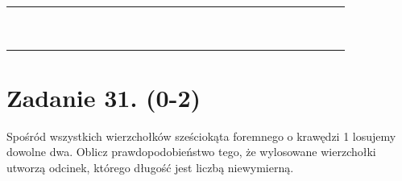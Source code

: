 \documentclass[10pt]{article}
\begin{document}
\begin{center}
\begin{tabular}{|c|c|c|c|c|c|c|c|c|c|c|c|c|c|c|c|c|c|c|c|c|c|c|c|c|c|c|c|c|c|}
\hline
 &  &  &  &  &  &  &  &  &  &  &  &  &  &  &  &  &  &  &  &  &  &  &  &  &  &  &  &  &  \\
\hline
 &  &  &  &  &  &  &  &  &  &  &  &  &  &  &  &  &  &  &  &  &  &  &  &  &  &  &  &  &  \\
\hline
 &  &  &  &  &  &  &  &  &  &  &  &  &  &  &  &  &  &  &  &  &  &  &  &  &  &  &  &  &  \\
\hline
 &  &  &  &  &  &  &  &  &  &  &  &  &  &  &  &  &  &  &  &  &  &  &  &  &  &  &  &  &  \\
\hline
 &  &  &  &  &  &  &  &  &  &  &  &  &  &  &  &  &  &  &  &  &  &  &  &  &  &  &  &  &  \\
\hline
 &  &  &  &  &  &  &  &  &  &  &  &  &  &  &  &  &  &  &  &  &  &  &  &  &  &  &  &  &  \\
\hline
 &  &  &  &  &  &  &  &  &  &  &  &  &  &  &  &  &  &  &  &  &  &  &  &  &  &  &  &  &  \\
\hline
 &  &  &  &  &  &  &  &  &  &  &  &  &  &  &  &  &  &  &  &  &  &  &  &  &  &  &  &  &  \\
\hline
 &  &  &  &  &  &  &  &  &  &  &  &  &  &  &  &  &  &  &  &  &  &  &  &  &  &  &  &  &  \\
\hline
 &  &  &  &  &  &  &  &  &  &  &  &  &  &  &  &  &  &  &  &  &  &  &  &  &  &  &  &  &  \\
\hline
 &  &  &  &  &  &  &  &  &  &  &  &  &  &  &  &  &  &  &  &  &  &  &  &  &  &  &  &  &  \\
\hline
\end{tabular}
\end{center}

\section*{Zadanie 31. (0-2)}
Spośród wszystkich wierzchołków sześciokąta foremnego o krawędzi 1 losujemy dowolne dwa. Oblicz prawdopodobieństwo tego, że wylosowane wierzchołki utworzą odcinek, którego długość jest liczbą niewymierną.
\end{document}
